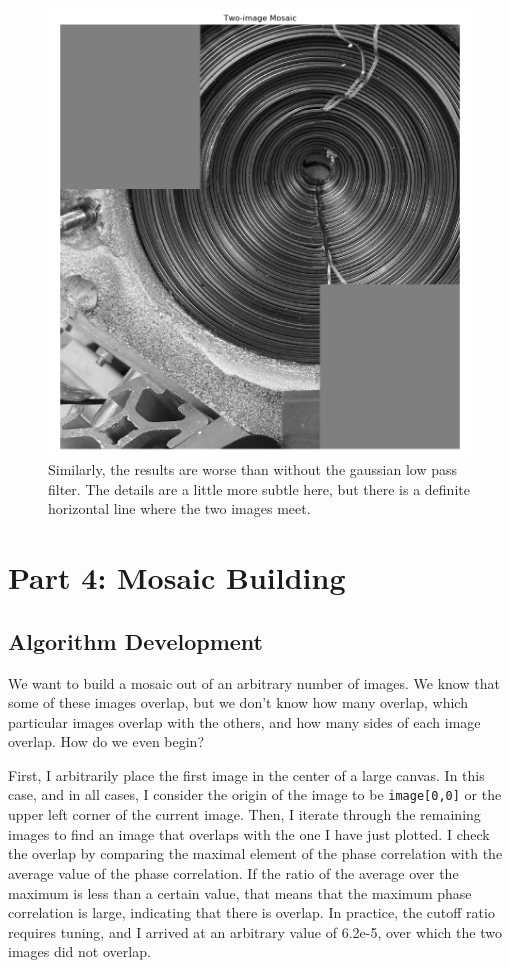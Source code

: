 \documentclass[]{article}
\begin{document}
\begin{figure}[H]
	\centering
	\includegraphics[width=6.5in]{p3_output/img_1_mosaic_lp.png}
	\caption{Similarly, the results are worse than without the gaussian low pass filter. The details are a little more subtle here, but there is a definite horizontal line where the two images meet.}
\end{figure}


\newpage

\section{Part 4: Mosaic Building}
\subsection{Algorithm Development}
We want to build a mosaic out of an arbitrary number of images. We know that some of these images overlap, but we don't know how many overlap, which particular images overlap with the others, and how many sides of each image overlap. How do we even begin?

First, I arbitrarily place the first image in the center of a large canvas. In this case, and in all cases, I consider the origin of the image to be \texttt{image[0,0]} or the upper left corner of the current image. Then, I iterate through the remaining images to find an image that overlaps with the one I have just plotted. I check the overlap by comparing the maximal element of the phase correlation with the average value of the phase correlation. If the ratio of the average over the maximum is less than a certain value, that means that the maximum phase correlation is large, indicating that there is overlap. In practice, the cutoff ratio requires tuning, and I arrived at an arbitrary value of 6.2e-5, over which the two images did not overlap.
\end{document}

